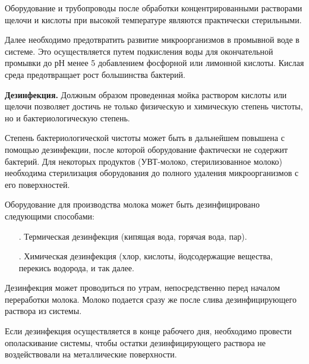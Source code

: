{\par \redline Оборудование и трубопроводы после обработки концентрированными растворами щелочи и кислоты при высокой температуре являются практически стерильными.

\par \redline Далее необходимо предотвратить развитие микроорганизмов в промывной воде в системе. Это осуществляется путем подкисления воды для окончательной промывки до рН менее 5 добавлением фосфорной или лимонной кислоты. Кислая среда предотвращает рост большинства бактерий.

\par \redline \textbf{Дезинфекция.} Должным образом проведенная мойка раствором кислоты или щелочи позволяет достичь не только физическую и химическую степень чистоты, но и бактериологическую степень.

\par \redline Степень бактериологической чистоты может быть в дальнейшем повышена с помощью дезинфекции, после которой оборудование фактически не содержит бактерий. Для некоторых продуктов (УВТ-молоко, стерилизованное молоко) необходима стерилизация оборудования до полного удаления микроорганизмов с его поверхностей.

\par \redline Оборудование для производства молока может быть дезинфицировано следующими способами:

\begin{itemize}[leftmargin=2.15cm, labelwidth=0.65cm, labelsep=0.0cm] 
	
	\item[\theitemcntr. ] Термическая дезинфекция (кипящая вода, горячая вода, пар).
	\addtocounter{itemcntr}{1}
	
	\item[\theitemcntr. ] Химическая дезинфекция (хлор, кислоты, йодсодержащие вещества, перекись водорода, и так далее.
	\addtocounter{itemcntr}{1}
	
	\setcounter{itemcntr}{1}
\end{itemize}


\par \redline Дезинфекция может проводиться по утрам, непосредственно перед началом переработки молока. Молоко подается сразу же после слива дезинфицирующего раствора из системы.

\par \redline Если дезинфекция осуществляется в конце рабочего дня, необходимо провести ополаскивание системы, чтобы остатки дезинфицирующего раствора не воздействовали на металлические поверхности.

}
